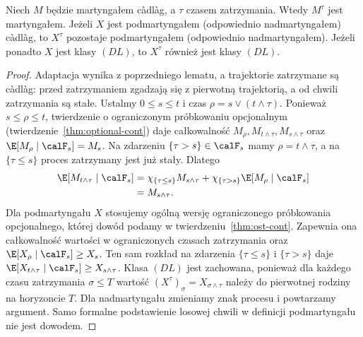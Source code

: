 \begin{twierdzenie}
\label{thm:mart-cont-stopping}
Niech $M$ będzie martyngałem c\`adl\`ag, a $\tau$
czasem zatrzymania. Wtedy $M^\tau$ jest martyngałem.
Jeżeli $X$ jest podmartyngałem (odpowiednio nadmartyngałem)
c\`adl\`ag, to $X^\tau$ pozostaje podmartyngałem
(odpowiednio nadmartyngałem).
Jeżeli ponadto $X$ jest klasy $(DL)$,
to $X^\tau$ również jest klasy $(DL)$.
\end{twierdzenie}
\begin{proof}
Adaptacja wynika z poprzedniego lematu, a trajektorie
zatrzymane są c\`adl\`ag: przed zatrzymaniem
zgadzają się z pierwotną trajektorią, a od chwili
zatrzymania są stałe. Ustalmy $0\le s\le t$ i czas
$\rho=s\vee(t\wedge\tau)$. Ponieważ
$s\le\rho\le t$, twierdzenie o ograniczonym
próbkowaniu opcjonalnym (twierdzenie~\ref{thm:optional-cont})
daje całkowalność $M_\rho,M_{t\wedge\tau},M_{s\wedge\tau}$
oraz $\E[M_\rho\mid\calF_s]=M_s$.
Na zdarzeniu $\{\tau>s\}\in\calF_s$ mamy
$\rho=t\wedge\tau$, a na $\{\tau\le s\}$
proces zatrzymany jest już stały. Dlatego
\[
\begin{aligned}
\E[M_{t\wedge\tau}\mid\calF_s]
&=\chi_{\{\tau\le s\}}M_{s\wedge\tau}
 +\chi_{\{\tau>s\}}\E[M_\rho\mid\calF_s]\\
&=M_{s\wedge\tau}.
\end{aligned}
\]
Dla podmartyngału $X$ stosujemy ogólną wersję
ograniczonego próbkowania opcjonalnego, której dowód
podamy w twierdzeniu~\ref{thm:ost-cont}.
Zapewnia ona całkowalność wartości w ograniczonych
czasach zatrzymania oraz
$\E[X_\rho\mid\calF_s]\ge X_s$.
Ten sam rozkład na zdarzenia
$\{\tau\le s\}$ i $\{\tau>s\}$ daje
$\E[X_{t\wedge\tau}\mid\calF_s]\ge X_{s\wedge\tau}$.
Klasa $(DL)$ jest zachowana,
ponieważ dla każdego czasu zatrzymania $\sigma\le T$
wartość $(X^\tau)_\sigma=X_{\sigma\wedge\tau}$
należy do pierwotnej rodziny na horyzoncie $T$.
Dla nadmartyngału zmieniamy
znak procesu i powtarzamy argument. Samo formalne
podstawienie losowej chwili w definicji podmartyngału
nie jest dowodem.
\end{proof}



